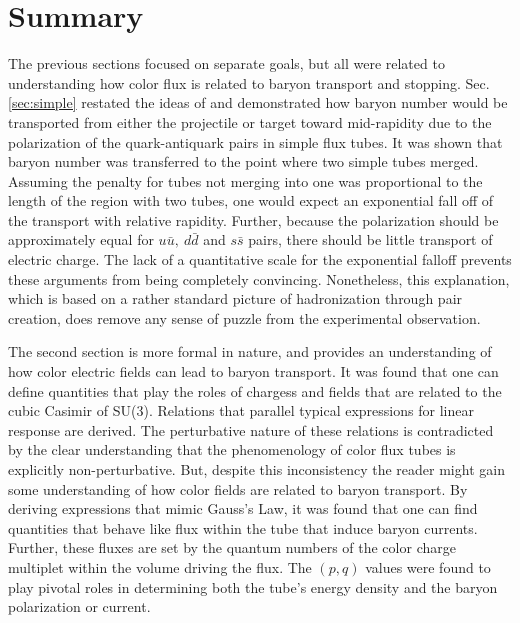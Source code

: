 \documentclass[aps, prc, 12pt, nofootinbib, showpacs, superscriptaddress, tightenlines, groupedaddress]{revtex4-2}
\begin{document}
\section{Summary}
The previous sections focused on separate goals, but all were related to understanding how color flux is related to baryon transport and stopping. Sec. \ref{sec:simple} restated the ideas of \cite{Vance:1997th} and demonstrated how baryon number would be transported from either the projectile or target toward mid-rapidity due to the polarization of the quark-antiquark pairs in simple flux tubes. It was shown that baryon number was transferred to the point where two simple tubes merged. Assuming the penalty for tubes not merging into one was proportional to the length of the region with two tubes, one would expect an exponential fall off of the transport with relative rapidity. Further, because the polarization should be approximately equal for $u\bar{u},~d\bar{d}$ and $s\bar{s}$ pairs, there should be little transport of electric charge. The lack of a quantitative scale for the exponential falloff prevents these arguments from being completely convincing. Nonetheless, this explanation, which is based on a rather standard picture of hadronization through pair creation, does remove any sense of puzzle from the experimental observation.

The second section is more formal in nature, and provides an understanding of how color electric fields can lead to baryon transport. It was found that one can define quantities that play the roles of chargess and fields that are related to the cubic Casimir of SU(3). Relations that parallel typical expressions for linear response are derived. The perturbative nature of these relations is contradicted by the clear understanding that the phenomenology of color flux tubes is explicitly non-perturbative. But, despite this inconsistency the reader might gain some understanding of how color fields are related to baryon transport. By deriving expressions that mimic Gauss's Law, it was found that one can find quantities that behave like flux within the tube that induce baryon currents. Further, these fluxes are set by the quantum numbers of the color charge multiplet within the volume driving the flux. The $(p,q)$ values were found to play pivotal roles in determining both the tube's energy density and the baryon polarization or current.
\end{document}
